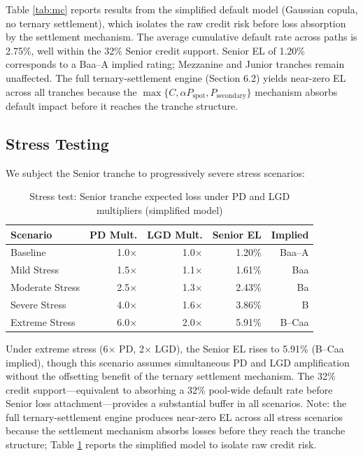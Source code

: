 \documentclass[12pt,a4paper]{article}
\begin{document}
Table \ref{tab:mc} reports results from the simplified default model (Gaussian copula, no ternary settlement), which isolates the raw credit risk before loss absorption by the settlement mechanism.
The average cumulative default rate across paths is 2.75\%, well within the 32\% Senior credit support.
Senior EL of 1.20\% corresponds to a Baa--A implied rating; Mezzanine and Junior tranches remain unaffected.
The full ternary-settlement engine (Section 6.2) yields near-zero EL across all tranches because the $\max\{C, \alpha P_{\text{spot}}, P_{\text{secondary}}\}$ mechanism absorbs default impact before it reaches the tranche structure.

\subsection{Stress Testing}

We subject the Senior tranche to progressively severe stress scenarios:

\begin{table}[H]
\centering
\caption{Stress test: Senior tranche expected loss under PD and LGD multipliers (simplified model)}
\label{tab:stress}
\begin{tabular}{@{}lrrrr@{}}
\toprule
\textbf{Scenario} & \textbf{PD Mult.} & \textbf{LGD Mult.} & \textbf{Senior EL} & \textbf{Implied} \\
\midrule
Baseline        & 1.0$\times$ & 1.0$\times$ & 1.20\% & Baa--A \\
Mild Stress     & 1.5$\times$ & 1.1$\times$ & 1.61\% & Baa \\
Moderate Stress & 2.5$\times$ & 1.3$\times$ & 2.43\% & Ba \\
Severe Stress   & 4.0$\times$ & 1.6$\times$ & 3.86\% & B \\
Extreme Stress  & 6.0$\times$ & 2.0$\times$ & 5.91\% & B--Caa \\
\bottomrule
\end{tabular}
\end{table}

Under extreme stress (6$\times$ PD, 2$\times$ LGD), the Senior EL rises to 5.91\% (B--Caa implied), though this scenario assumes simultaneous PD and LGD amplification without the offsetting benefit of the ternary settlement mechanism.
The 32\% credit support---equivalent to absorbing a 32\% pool-wide default rate before Senior loss attachment---provides a substantial buffer in all scenarios.
Note: the full ternary-settlement engine produces near-zero EL across all stress scenarios because the settlement mechanism absorbs losses before they reach the tranche structure; Table \ref{tab:stress} reports the simplified model to isolate raw credit risk.
\end{document}
